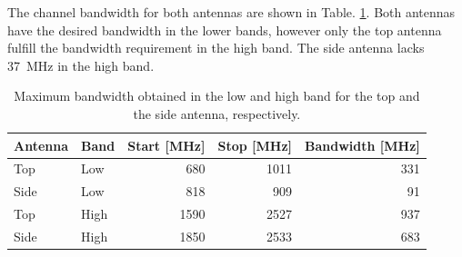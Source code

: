 The channel bandwidth for both antennas are shown in Table. \ref{tab:bw_sol1}. Both antennas have the desired bandwidth in the lower bands, however only the top antenna fulfill the bandwidth requirement in the high band. The side antenna lacks \SI{37}{MHz} in the high band.

    \begin{table}
        \centering
        \begin{tabular}{|l|l|r|r|r|}
            \hline
            Antenna & Band & Start [MHz] & Stop [MHz] & Bandwidth [MHz] \\
            \hline
            Top     & Low  & 680         & 1011       & 331 \\
            Side    & Low  & 818         & 909        & 91 \\
            \hline
            Top     & High & 1590        & 2527       & 937 \\
            Side    & High & 1850        & 2533       & 683 \\
            \hline
        \end{tabular}
        \caption{Maximum bandwidth obtained in the low and high band for the top and the side antenna, respectively.}
        \label{tab:bw_sol1}
    \end{table}

